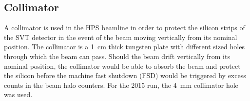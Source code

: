 \subsection{Collimator}

A collimator is used in the HPS beamline in order to protect the silicon strips of the SVT detector in the event of the beam moving vertically from its nominal position. The collimator is a 1~cm thick tungsten plate with different sized holes through which the beam can pass. Should the beam drift vertically from its nominal position, the collimator would be able to absorb the beam and protect the silicon before the machine fast shutdown (FSD) would be triggered by excess counts in the beam halo counters. For the 2015 run, the 4~mm collimator hole was used. 

